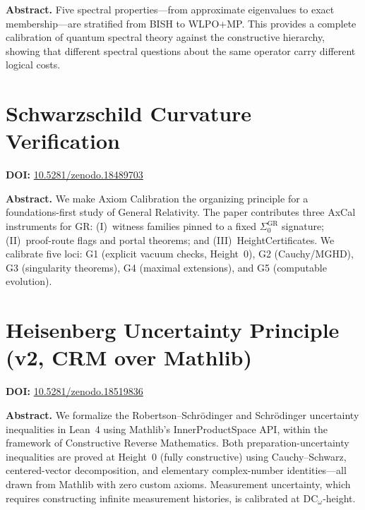 \documentclass[11pt,a4paper]{article}
\begin{document}
\bigskip
\noindent\textbf{Abstract.}
Five spectral properties---from approximate eigenvalues to exact membership---are stratified from BISH to WLPO+MP. This provides a complete calibration of quantum spectral theory against the constructive hierarchy, showing that different spectral questions about the same operator carry different logical costs.

\section{Schwarzschild Curvature Verification}
\label{sec:p5}
\textbf{DOI:} \href{https://doi.org/10.5281/zenodo.18489703}{10.5281/zenodo.18489703}

\bigskip
\noindent\textbf{Abstract.}
We make Axiom Calibration the organizing principle for a foundations-first study of General Relativity. The paper contributes three AxCal instruments for GR: (I)~witness families pinned to a fixed $\Sigma_0^{\mathrm{GR}}$ signature; (II)~proof-route flags and portal theorems; and (III)~HeightCertificates. We calibrate five loci: G1 (explicit vacuum checks, Height~0), G2 (Cauchy/MGHD), G3 (singularity theorems), G4 (maximal extensions), and G5 (computable evolution).

\section{Heisenberg Uncertainty Principle (v2, CRM over Mathlib)}
\label{sec:p6}
\textbf{DOI:} \href{https://doi.org/10.5281/zenodo.18519836}{10.5281/zenodo.18519836}

\bigskip
\noindent\textbf{Abstract.}
We formalize the Robertson--Schr\"odinger and Schr\"odinger uncertainty inequalities in Lean~4 using Mathlib's InnerProductSpace API, within the framework of Constructive Reverse Mathematics. Both preparation-uncertainty inequalities are proved at Height~0 (fully constructive) using Cauchy--Schwarz, centered-vector decomposition, and elementary complex-number identities---all drawn from Mathlib with zero custom axioms. Measurement uncertainty, which requires constructing infinite measurement histories, is calibrated at $\mathrm{DC}_\omega$-height.

\newpage
\end{document}
